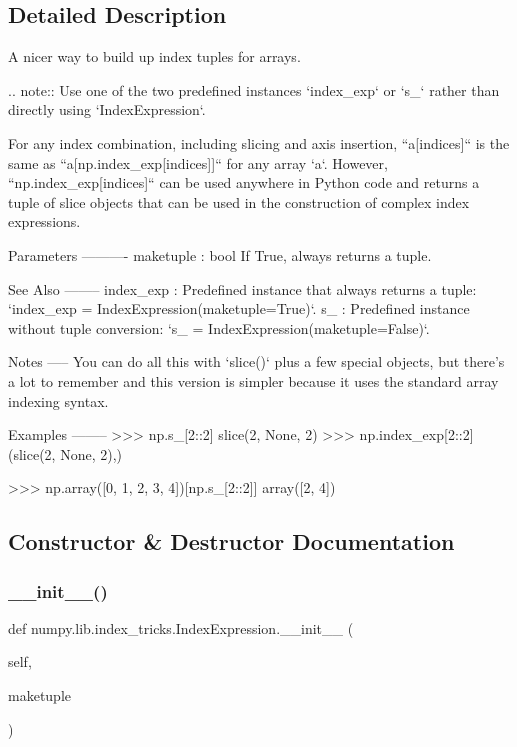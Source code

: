\subsection{Detailed Description}
\begin{DoxyVerb}A nicer way to build up index tuples for arrays.

.. note::
   Use one of the two predefined instances `index_exp` or `s_`
   rather than directly using `IndexExpression`.

For any index combination, including slicing and axis insertion,
``a[indices]`` is the same as ``a[np.index_exp[indices]]`` for any
array `a`. However, ``np.index_exp[indices]`` can be used anywhere
in Python code and returns a tuple of slice objects that can be
used in the construction of complex index expressions.

Parameters
----------
maketuple : bool
    If True, always returns a tuple.

See Also
--------
index_exp : Predefined instance that always returns a tuple:
   `index_exp = IndexExpression(maketuple=True)`.
s_ : Predefined instance without tuple conversion:
   `s_ = IndexExpression(maketuple=False)`.

Notes
-----
You can do all this with `slice()` plus a few special objects,
but there's a lot to remember and this version is simpler because
it uses the standard array indexing syntax.

Examples
--------
>>> np.s_[2::2]
slice(2, None, 2)
>>> np.index_exp[2::2]
(slice(2, None, 2),)

>>> np.array([0, 1, 2, 3, 4])[np.s_[2::2]]
array([2, 4])\end{DoxyVerb}
 

\subsection{Constructor \& Destructor Documentation}
\mbox{\label{classnumpy_1_1lib_1_1index__tricks_1_1IndexExpression_ab5cc81085a9a92e029f98159c029bc52}} 
\subsubsection{\texorpdfstring{\+\_\+\+\_\+init\+\_\+\+\_\+()}{\_\_init\_\_()}}
{\footnotesize\ttfamily def numpy.\+lib.\+index\+\_\+tricks.\+Index\+Expression.\+\_\+\+\_\+init\+\_\+\+\_\+ (\begin{DoxyParamCaption}\item[{}]{self,  }\item[{}]{maketuple }\end{DoxyParamCaption})}



